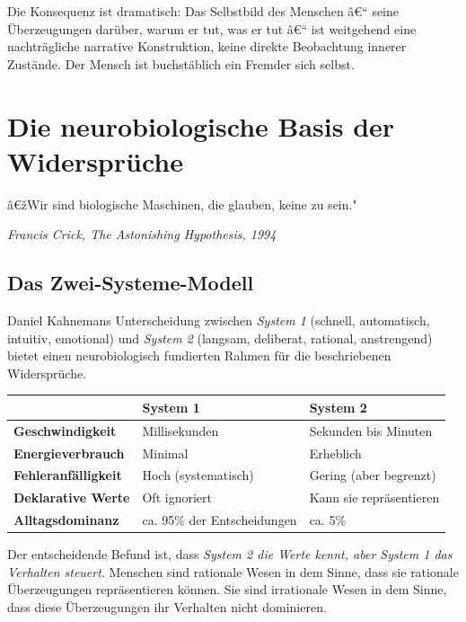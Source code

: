 ﻿\documentclass[12pt, a4paper]{article}
\begin{document}
Die Konsequenz ist dramatisch: Das Selbstbild des Menschen â€“ seine Überzeugungen
darüber, warum er tut, was er tut â€“ ist weitgehend eine nachträgliche narrative
Konstruktion, keine direkte Beobachtung innerer Zustände. Der Mensch ist
buchstäblich ein Fremder sich selbst.

\section{Die neurobiologische Basis der Widersprüche}

\epigraph{â€žWir sind biologische Maschinen, die glauben, keine zu sein."}%
{\textit{Francis Crick, The Astonishing Hypothesis, 1994}}

\subsection{Das Zwei-Systeme-Modell}

Daniel Kahnemans Unterscheidung zwischen \emph{System 1} (schnell, automatisch,
intuitiv, emotional) und \emph{System 2} (langsam, deliberat, rational, anstrengend)
bietet einen neurobiologisch fundierten Rahmen für die beschriebenen Widersprüche.

\medskip
\begin{tabular}{>{\bfseries}p{4cm} p{4.5cm} p{4.5cm}}
\toprule
& System 1 & System 2 \\
\midrule
Geschwindigkeit & Millisekunden & Sekunden bis Minuten \\
Energieverbrauch & Minimal & Erheblich \\
Fehleranfälligkeit & Hoch (systematisch) & Gering (aber begrenzt) \\
Deklarative Werte & Oft ignoriert & Kann sie repräsentieren \\
Alltagsdominanz & ca. 95\% der Entscheidungen & ca. 5\% \\
\bottomrule
\end{tabular}
\medskip

Der entscheidende Befund ist, dass \emph{System 2 die Werte kennt, aber
System 1 das Verhalten steuert}. Menschen sind rationale Wesen in dem Sinne,
dass sie rationale Überzeugungen repräsentieren können. Sie sind irrationale
Wesen in dem Sinne, dass diese Überzeugungen ihr Verhalten nicht dominieren.
\end{document}
